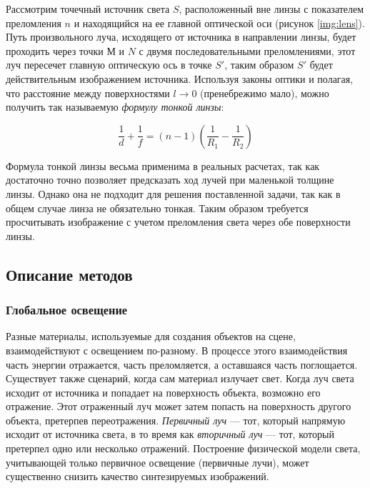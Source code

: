
Рассмотрим точечный источник света $S$, расположенный вне линзы с показателем преломления $n$ и находящийся на ее главной оптической оси (рисунок \ref{img:lens}). Путь произвольного луча, исходящего от источника в направлении линзы, будет проходить через точки $М$ и $N$ с двумя последовательными преломлениями, этот луч пересечет главную оптическую ось в точке $S'$, таким образом $S'$ будет действительным изображением источника. Используя законы оптики и полагая, что расстояние между поверхностями $l \rightarrow 0$ (пренебрежимо мало), можно получить так называемую \textit{формулу тонкой линзы}:

\begin{equation}
	\label{eq:thin_lens}
	\frac{1}{d} + \frac{1}{f} = (n-1)\left(\frac{1}{R_1} - \frac{1}{R_2}\right)
\end{equation}

Формула тонкой линзы весьма применима в реальных расчетах, так как достаточно точно позволяет предсказать ход лучей при маленькой толщине линзы. Однако она не подходит для решения поставленной задачи, так как в общем случае линза не обязательно тонкая. Таким образом требуется просчитывать изображение с учетом преломления света через обе поверхности линзы.


\subsection{Описание методов}
\subsubsection{Глобальное освещение}

Разные материалы, используемые для создания объектов на сцене, взаимодействуют с освещением по-разному. В процессе этого взаимодействия часть энергии отражается, часть преломляется, а оставшаяся часть поглощается. Существует также сценарий, когда сам материал излучает свет. Когда луч света исходит от источника и попадает на поверхность объекта, возможно его отражение. Этот отраженный луч может затем попасть на поверхность другого объекта, претерпев переотражения. \textit{Первичный луч} --- тот, который напрямую исходит от источника света, в то время как  \textit{вторичный луч} --- тот, который претерпел одно или несколько отражений. Построение физической модели света, учитывающей только первичное освещение (первичные лучи), может существенно снизить качество синтезируемых изображений.

